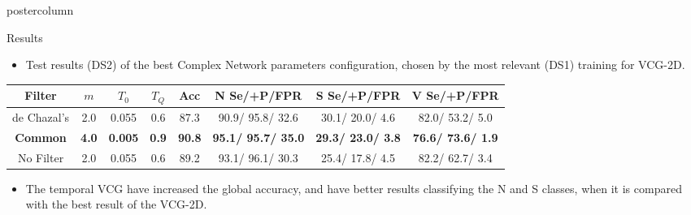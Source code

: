 \documentclass{article}
\begin{document}
\begin{frame}
\begin{columns}
\begin{column}{.5\textwidth}
\begin{beamercolorbox}[center,wd=\textwidth]{postercolumn}
\begin{minipage}[T]{.98\textwidth}
{\begin{block}{Results}
{\begin{table}[h!]
\begin{center}
            				\end{center}
            			\end{table}}
            			\begin{itemize}
            				\item Test results (DS2) of the best Complex Network parameters configuration, chosen by the most relevant (DS1) training for VCG-2D.
            			\end{itemize}
            			{\small				
            				\begin{table}[h!]					
            					\begin{center}						
            						\label{tab:results2d} 
            						\centering	
            						\begin{tabular}{|c|c|c|c|c|c|c|c|} 
            							\hline 
            							Filter & $m$ & $T_0$ & $T_Q$ & Acc & N Se/+P/FPR & S Se/+P/FPR & V Se/+P/FPR  \\ \hline \hline
            							de Chazal's & 2.0 & 0.055 & 0.6 &   87.3 &   90.9/  95.8/  32.6 &   30.1/  20.0/   4.6 &   82.0/  53.2/   5.0 \\ 			\hline
            							\textbf{Common}   & \textbf{4.0} & \textbf{0.005} & \textbf{0.9} &   \textbf{90.8} &   \textbf{95.1/  95.7/  35.0} &   \textbf{29.3/  23.0/   3.8} &   \textbf{76.6/  73.6/   1.9} \\			\hline
            							No Filter& 2.0 & 0.055 & 0.6 &    89.2 &   93.1/  96.1/  30.3 &   25.4/  17.8/   4.5 &   82.2/  62.7/   3.4 \\ 		\hline \hline
            						\end{tabular} 
            						\vspace{0.15cm}
            						\linebreak 						
            					\end{center}
            				\end{table}}
            \begin{itemize}
            	\item The temporal VCG have increased the global accuracy, and have better results classifying the N and S classes, when it is compared with the best result of the VCG-2D.
            	
            \end{itemize}
            

\end{block}}
\end{minipage}
\end{beamercolorbox}
\end{column}
\end{columns}
\end{frame}
\end{document}
